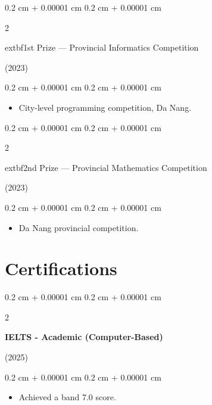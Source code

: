 \documentclass[10pt, letterpaper]{article}
\newenvironment{highlights}{
    \begin{itemize}[
        topsep=0.10 cm,
        parsep=0.10 cm,
        partopsep=0pt,
        itemsep=0pt,
        leftmargin=0.4 cm + 10pt
    ]
}{
    \end{itemize}
} %
\newenvironment{onecolentry}{
    \begin{adjustwidth}{
        0.2 cm + 0.00001 cm
    }{
        0.2 cm + 0.00001 cm
    }
}{
    \end{adjustwidth}
} %
\newenvironment{twocolentry}[2][]{
    \onecolentry
    \def\secondColumn{#2}
    \setcolumnwidth{\fill, 4.5 cm}
    \begin{paracol}{2}
}{
    \switchcolumn \raggedleft \secondColumn
    \end{paracol}
    \endonecolentry
} %
\begin{document}
        \vspace{0.2 cm}

        \begin{twocolentry}{(2023)}
            	extbf{1st Prize — Provincial Informatics Competition}
        \end{twocolentry}

        \vspace{0.10 cm}
        \begin{onecolentry}
            \begin{highlights}
                \item City-level programming competition, Da Nang.
            \end{highlights}
        \end{onecolentry}

        \vspace{0.2 cm}

        \begin{twocolentry}{(2023)}
            	extbf{2nd Prize — Provincial Mathematics Competition}
        \end{twocolentry}

        \vspace{0.10 cm}
        \begin{onecolentry}
            \begin{highlights}
                \item Da Nang provincial competition.
            \end{highlights}
        \end{onecolentry}

\vspace{0.2 cm}

\section{Certifications}

    \begin{twocolentry}{(2025)}
        \textbf{IELTS - Academic (Computer-Based)}
    \end{twocolentry}

    \vspace{0.10 cm}
    \begin{onecolentry}
        \begin{highlights}
            \item Achieved a band 7.0 score.
        \end{highlights}
    \end{onecolentry}
\end{document}
